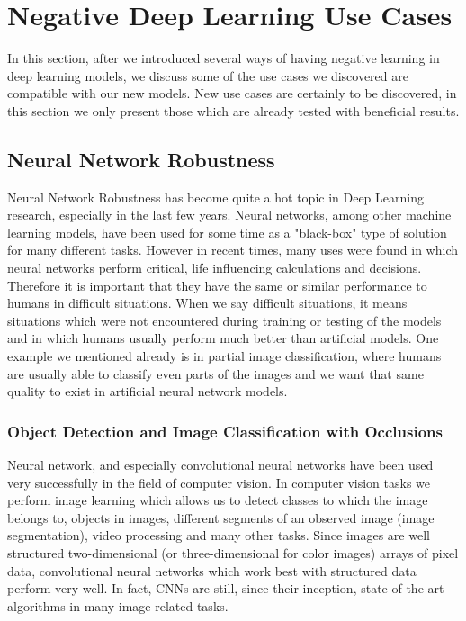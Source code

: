 \documentclass[b5paper]{book}
\begin{document}
\section{Negative Deep Learning Use Cases}

In this section, after we introduced several ways of having negative learning in deep learning models, we discuss some of the use cases we discovered are compatible with our new models. New use cases are certainly to be discovered, in this section we only present those which are already tested with beneficial results.

\subsection{Neural Network Robustness}

Neural Network Robustness has become quite a hot topic in Deep Learning research, especially in the last few years. Neural networks, among other machine learning models, have been used for some time as a "black-box" type of solution for many different tasks. However in recent times, many uses were found in which neural networks perform critical, life influencing calculations and decisions. Therefore it is important that they have the same or similar performance to humans in difficult situations. When we say difficult situations, it means situations which were not encountered during training or testing of the models and in which humans usually perform much better than artificial models. One example we mentioned already is in partial image classification, where humans are usually able to classify even parts of the images and we want that same quality to exist in artificial neural network models.

\subsubsection{Object Detection and Image Classification with Occlusions}

Neural network, and especially convolutional neural networks have been used very successfully in the field of computer vision. In computer vision tasks we perform image learning which allows us to detect classes to which the image belongs to, objects in images, different segments of an observed image (image segmentation), video processing and many other tasks. Since images are well structured two-dimensional (or three-dimensional for color images) arrays of pixel data, convolutional neural networks which work best with structured data perform very well. In fact, CNNs are still, since their inception, state-of-the-art algorithms in many image related tasks. 
\end{document}
